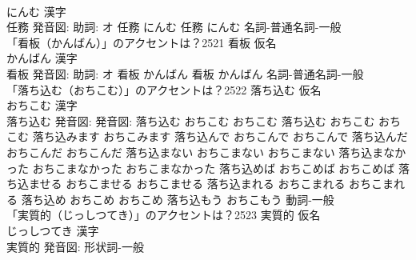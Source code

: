 \documentclass[8pt]{extreport}
\begin{document}
\begin{CJK}{UTF8}{min}
\\	にんむ 漢字　
\\	任務 発音図: 助詞: オ	任務 にんむ		任務 にんむ				名詞-普通名詞-一般 
\\	「看板（かんばん）」のアクセントは？2521	看板 仮名　
\\	かんばん 漢字　
\\	看板 発音図: 助詞: オ	看板 かんばん		看板 かんばん				名詞-普通名詞-一般 
\\	「落ち込む（おちこむ）」のアクセントは？2522	落ち込む 仮名　
\\	おちこむ 漢字　
\\	落ち込む 発音図: 発音図:	落ち込む おちこむ おちこむ		落ち込む おちこむ おちこむ 落ち込みます おちこみます 落ち込んで おちこんで おちこんで 落ち込んだ おちこんだ おちこんだ 落ち込まない おちこまない おちこまない 落ち込まなかった おちこまなかった おちこまなかった 落ち込めば おちこめば おちこめば 落ち込ませる おちこませる おちこませる 落ち込まれる おちこまれる おちこまれる 落ち込め おちこめ おちこめ 落ち込もう おちこもう				動詞-一般 
\\	「実質的（じっしつてき）」のアクセントは？2523	実質的 仮名　
\\	じっしつてき 漢字　
\\	実質的 発音図:							形状詞-一般 
\end{CJK}
\end{document}

